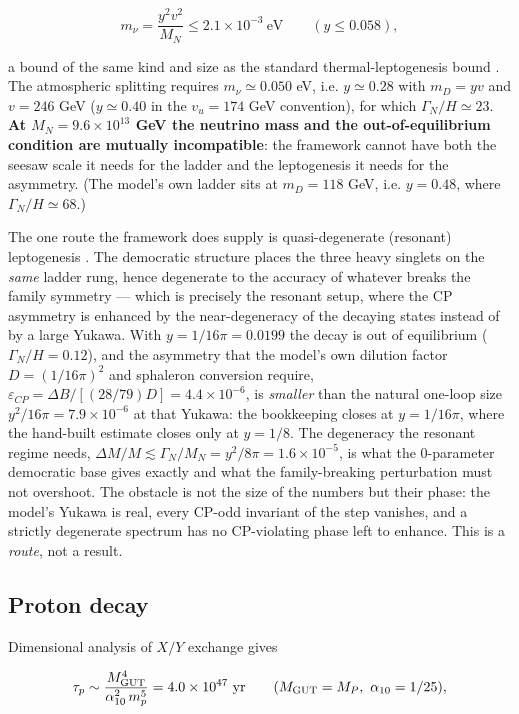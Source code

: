 \documentclass[aps,prd,amsmath,amssymb,superscriptaddress,longbibliography,floatfix,preprint]{revtex4-2}
\begin{document}
\[m_\nu = \frac{y^2 v^2}{M_N} \le 2.1\times10^{-3}\ \mathrm{eV}\qquad (y \le 0.058),\]

a bound of the same kind and size as the standard thermal-leptogenesis bound \cite{ref32}. The atmospheric splitting requires $m_\nu \simeq 0.050$ eV, i.e. $y \simeq 0.28$ with $m_D = yv$ and $v = 246$ GeV ($y \simeq 0.40$ in the $v_u = 174$ GeV convention), for which $\Gamma_N/H \simeq 23$. \textbf{At $M_N = 9.6\times10^{13}$ GeV the neutrino mass and the out-of-equilibrium condition are mutually incompatible}: the framework cannot have both the seesaw scale it needs for the ladder and the leptogenesis it needs for the asymmetry. (The model's own ladder sits at $m_D = 118$ GeV, i.e. $y = 0.48$, where $\Gamma_N/H \simeq 68$.)

The one route the framework does supply is quasi-degenerate (resonant) leptogenesis \cite{ref31,ref40}. The democratic structure places the three heavy singlets on the \emph{same} ladder rung, hence degenerate to the accuracy of whatever breaks the family symmetry --- which is precisely the resonant setup, where the CP asymmetry is enhanced by the near-degeneracy of the decaying states instead of by a large Yukawa. With $y = 1/16\pi = 0.0199$ the decay is out of equilibrium ($\Gamma_N/H = 0.12$), and the asymmetry that the model's own dilution factor $D = (1/16\pi)^2$ and sphaleron conversion require, $\varepsilon_{CP} = \Delta B/[(28/79)D] = 4.4\times10^{-6}$, is \emph{smaller} than the natural one-loop size $y^2/16\pi = 7.9\times10^{-6}$ at that Yukawa: the bookkeeping closes at $y = 1/16\pi$, where the hand-built estimate closes only at $y = 1/8$. The degeneracy the resonant regime needs, $\Delta M/M \lesssim \Gamma_N/M_N = y^2/8\pi = 1.6\times10^{-5}$, is what the 0-parameter democratic base gives exactly and what the family-breaking perturbation must not overshoot. The obstacle is not the size of the numbers but their phase: the model's Yukawa is real, every CP-odd invariant of the step vanishes, and a strictly degenerate spectrum has no CP-violating phase left to enhance. This is a \emph{route}, not a result.

\subsection{Proton decay}

Dimensional analysis of $X/Y$ exchange gives

\[\tau_p \sim \frac{M_{\rm GUT}^4}{\alpha_{10}^2\, m_p^5} = 4.0\times10^{47}\ \mathrm{yr}\qquad (M_{\rm GUT} = M_P,\ \alpha_{10} = 1/25),\]
\end{document}
